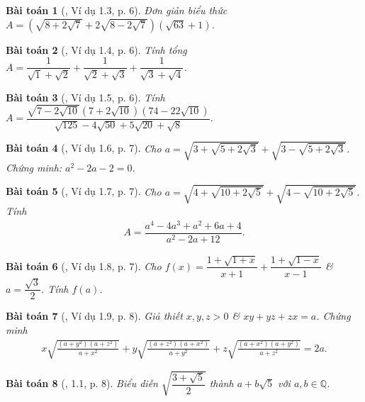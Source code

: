 \documentclass{article}
\newtheorem{baitoan}{Bài toán}
\begin{document}
\begin{baitoan}[\cite{TLCT_THCS_Toan_9_dai_so}, Ví dụ 1.3, p. 6]
	Đơn giản biểu thức $A = \left(\sqrt{8 + 2\sqrt{7}} + 2\sqrt{8 - 2\sqrt{7}}\right)(\sqrt{63} + 1)$.
\end{baitoan}

\begin{baitoan}[\cite{TLCT_THCS_Toan_9_dai_so}, Ví dụ 1.4, p. 6]
	Tính tổng $A = \dfrac{1}{\sqrt{1} + \sqrt{2}} + \dfrac{1}{\sqrt{2} + \sqrt{3}} + \dfrac{1}{\sqrt{3} + \sqrt{4}}$.
\end{baitoan}

\begin{baitoan}[\cite{TLCT_THCS_Toan_9_dai_so}, Ví dụ 1.5, p. 6]
	Tính $A = \dfrac{\sqrt{7 - 2\sqrt{10}}(7 + 2\sqrt{10})(74 - 22\sqrt{10})}{\sqrt{125} - 4\sqrt{50} + 5\sqrt{20} + \sqrt{8}}$.
\end{baitoan}

\begin{baitoan}[\cite{TLCT_THCS_Toan_9_dai_so}, Ví dụ 1.6, p. 7]
	Cho $a = \sqrt{3 + \sqrt{5 + 2\sqrt{3}}} + \sqrt{3 - \sqrt{5 + 2\sqrt{3}}}$. Chứng minh: $a^2 - 2a - 2 = 0$.
\end{baitoan}

\begin{baitoan}[\cite{TLCT_THCS_Toan_9_dai_so}, Ví dụ 1.7, p. 7]
	Cho $a = \sqrt{4 + \sqrt{10 + 2\sqrt{5}}} + \sqrt{4 - \sqrt{10 + 2\sqrt{5}}}$. Tính
	\begin{align*}
		A = \dfrac{a^4 - 4a^3 + a^2 + 6a + 4}{a^2 - 2a + 12}.
	\end{align*}
\end{baitoan}

\begin{baitoan}[\cite{TLCT_THCS_Toan_9_dai_so}, Ví dụ 1.8, p. 7]
	Cho $f(x) = \dfrac{1 + \sqrt{1 + x}}{x + 1} + \dfrac{1 + \sqrt{1 - x}}{x - 1}$ \& $a = \dfrac{\sqrt{3}}{2}$. Tính $f(a)$.
\end{baitoan}

\begin{baitoan}[\cite{TLCT_THCS_Toan_9_dai_so}, Ví dụ 1.9, p. 8]
	Giả thiết $x,y,z > 0$ \& $xy + yz + zx = a$. Chứng minh
	\begin{align*}
		x\sqrt{\frac{(a + y^2)(a + z^2)}{a + x^2}} + y\sqrt{\frac{(a + z^2)(a + x^2)}{a + y^2}} + z\sqrt{\frac{(a + x^2)(a + y^2)}{a + z^2}} = 2a.
	\end{align*}
\end{baitoan}

\begin{baitoan}[\cite{TLCT_THCS_Toan_9_dai_so}, 1.1, p. 8]
	Biểu diễn $\sqrt{\dfrac{3 + \sqrt{5}}{2}}$ thành $a + b\sqrt{5}$ với $a,b\in\mathbb{Q}$.
\end{baitoan}
\end{document}
